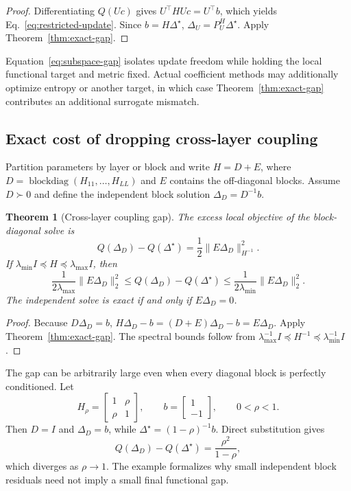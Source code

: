 \documentclass[letterpaper]{article} %
\theoremstyle{plain}
\newtheorem{theorem}{Theorem}
\theoremstyle{definition}
\begin{document}
\begin{proof}
Differentiating $Q(Uc)$ gives $U^\top HUc=U^\top b$, which yields Eq.~\eqref{eq:restricted-update}.
Since $b=H\Delta^\star$, $\Delta_U=P_U^H\Delta^\star$.
Apply Theorem~\ref{thm:exact-gap}.
\end{proof}

Equation~\eqref{eq:subspace-gap} isolates update freedom while holding the local functional target and metric fixed.
Actual coefficient methods may additionally optimize entropy or another target, in which case Theorem~\ref{thm:exact-gap} contributes an additional surrogate mismatch.

\subsection{Exact cost of dropping cross-layer coupling}
\label{app:cross-layer-gap}

Partition parameters by layer or block and write $H=D+E$, where $D=\operatorname{blockdiag}(H_{11},\ldots,H_{LL})$ and $E$ contains the off-diagonal blocks.
Assume $D\succ0$ and define the independent block solution $\Delta_D=D^{-1}b$.

\begin{theorem}[Cross-layer coupling gap]
\label{thm:cross-layer-gap}
The excess local objective of the block-diagonal solve is
\begin{equation}
Q(\Delta_D)-Q(\Delta^\star)
=\frac12\|E\Delta_D\|_{H^{-1}}^2.
\label{eq:cross-layer-gap}
\end{equation}
If $\lambda_{\min}I\preceq H\preceq\lambda_{\max}I$, then
\begin{equation}
\frac{1}{2\lambda_{\max}}\|E\Delta_D\|_2^2
\le Q(\Delta_D)-Q(\Delta^\star)
\le\frac{1}{2\lambda_{\min}}\|E\Delta_D\|_2^2.
\label{eq:cross-layer-bounds}
\end{equation}
The independent solve is exact if and only if $E\Delta_D=0$.
\end{theorem}

\begin{proof}
Because $D\Delta_D=b$, $H\Delta_D-b=(D+E)\Delta_D-b=E\Delta_D$.
Apply Theorem~\ref{thm:exact-gap}.
The spectral bounds follow from $\lambda_{\max}^{-1}I\preceq H^{-1}\preceq\lambda_{\min}^{-1}I$.
\end{proof}

The gap can be arbitrarily large even when every diagonal block is perfectly conditioned.
Let \[ H_\rho=\begin{bmatrix}1&\rho\\ \rho&1\end{bmatrix}, \qquad b=\begin{bmatrix}1\\-1\end{bmatrix}, \qquad 0<\rho<1.
\] Then $D=I$ and $\Delta_D=b$, while $\Delta^\star=(1-\rho)^{-1}b$.
Direct substitution gives
\begin{equation}
Q(\Delta_D)-Q(\Delta^\star)=\frac{\rho^2}{1-\rho},
\label{eq:cross-layer-example}
\end{equation}
which diverges as $\rho\to1$.
The example formalizes why small independent block residuals need not imply a small final functional gap.
\end{document}

